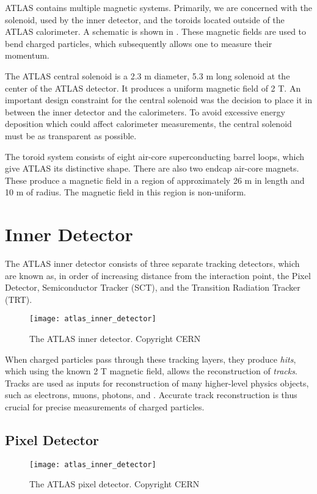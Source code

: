 ATLAS contains multiple magnetic systems.
Primarily, we are concerned with the solenoid, used by the inner detector, and the toroids located outside of the ATLAS calorimeter.
A schematic is shown in .
These magnetic fields are used to bend charged particles, which subsequently allows one to measure their momentum.

The ATLAS central solenoid is a 2.3 m diameter, 5.3 m long solenoid at the center of the ATLAS detector.
It produces a uniform magnetic field of 2 T.
An important design constraint for the central solenoid was the decision to place it in between the inner detector and the calorimeters.
To avoid excessive energy deposition which could affect calorimeter measurements, the central solenoid must be as transparent as possible\footnotemark.

The toroid system consists of eight air-core superconducting barrel loops, which give ATLAS its distinctive shape.
There are also two endcap air-core magnets.
These produce a magnetic field in a region of approximately 26 m in length and 10 m of radius.
The magnetic field in this region is non-uniform.

\section{Inner Detector}

The ATLAS inner detector consists of three separate tracking detectors, which are known as, in order of increasing distance from the interaction point, the Pixel Detector, Semiconductor Tracker (SCT), and the Transition Radiation Tracker (TRT).
\begin{figure}[tbp]
\caption{The ATLAS inner detector. Copyright CERN} \label{fig:atlas_inner_detector}
\texttt{[image: atlas\_inner\_detector]}
\end{figure}
When charged particles pass through these tracking layers, they produce \textit{hits}, which using the known 2 T magnetic field, allows the reconstruction of \textit{tracks}.
Tracks are used as inputs for reconstruction of many higher-level physics objects, such as electrons, muons, photons, and \met.
Accurate track reconstruction is thus crucial for precise measurements of charged particles.

\subsection{Pixel Detector}
\begin{figure}[tbp]
\caption{The ATLAS pixel detector. Copyright CERN} \label{fig:atlas_inner_detector}
\texttt{[image: atlas\_inner\_detector]}
\end{figure}

